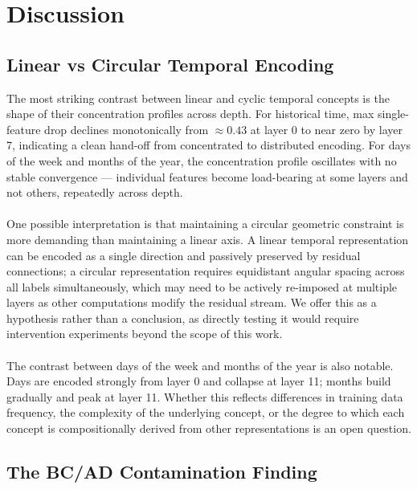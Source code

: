 \documentclass[11pt]{article}
\begin{document}
\section{Discussion}

\subsection{Linear vs Circular Temporal Encoding}

The most striking contrast between linear and cyclic temporal concepts is the shape of their concentration profiles across depth.
For historical time, max single-feature drop declines monotonically from $\approx 0.43$ at layer 0 to near zero by layer 7, indicating
a clean hand-off from concentrated to distributed encoding. For days of the week and months of the year, the concentration profile
oscillates with no stable convergence --- individual features become load-bearing at some layers and not others, repeatedly across depth.
\\
\\
One possible interpretation is that maintaining a circular geometric constraint is more demanding than maintaining a linear axis.
A linear temporal representation can be encoded as a single direction and passively preserved by residual connections; a circular
representation requires equidistant angular spacing across all labels simultaneously, which may need to be actively re-imposed at
multiple layers as other computations modify the residual stream. We offer this as a hypothesis rather than a conclusion, as directly
testing it would require intervention experiments beyond the scope of this work.
\\
\\
The contrast between days of the week and months of the year is also notable. Days are encoded strongly from layer 0 and collapse
at layer 11; months build gradually and peak at layer 11. Whether this reflects differences in training data frequency, the complexity
of the underlying concept, or the degree to which each concept is compositionally derived from other representations is an open question.

\subsection{The BC/AD Contamination Finding}
\end{document}
